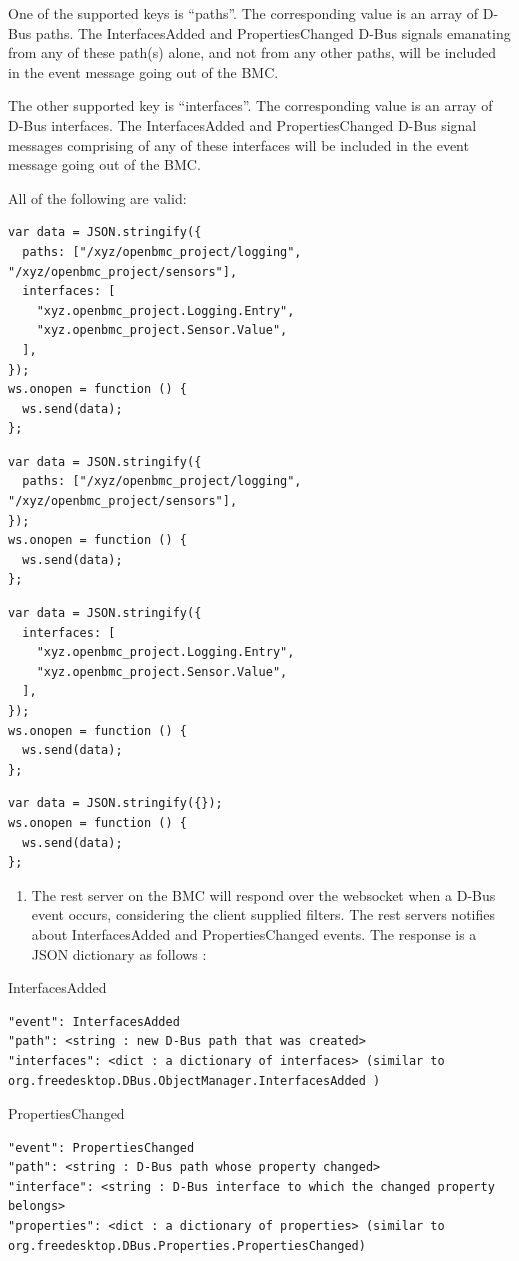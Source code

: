 One of the supported keys is ``paths''. The corresponding value is an
array of D-Bus paths. The InterfacesAdded and PropertiesChanged D-Bus
signals emanating from any of these path(s) alone, and not from any
other paths, will be included in the event message going out of the BMC.

The other supported key is ``interfaces''. The corresponding value is an
array of D-Bus interfaces. The InterfacesAdded and PropertiesChanged
D-Bus signal messages comprising of any of these interfaces will be
included in the event message going out of the BMC.

All of the following are valid:

\begin{verbatim}
var data = JSON.stringify({
  paths: ["/xyz/openbmc_project/logging", "/xyz/openbmc_project/sensors"],
  interfaces: [
    "xyz.openbmc_project.Logging.Entry",
    "xyz.openbmc_project.Sensor.Value",
  ],
});
ws.onopen = function () {
  ws.send(data);
};
\end{verbatim}

\begin{verbatim}
var data = JSON.stringify({
  paths: ["/xyz/openbmc_project/logging", "/xyz/openbmc_project/sensors"],
});
ws.onopen = function () {
  ws.send(data);
};
\end{verbatim}

\begin{verbatim}
var data = JSON.stringify({
  interfaces: [
    "xyz.openbmc_project.Logging.Entry",
    "xyz.openbmc_project.Sensor.Value",
  ],
});
ws.onopen = function () {
  ws.send(data);
};
\end{verbatim}

\begin{verbatim}
var data = JSON.stringify({});
ws.onopen = function () {
  ws.send(data);
};
\end{verbatim}

\begin{enumerate}
\def\labelenumi{\alph{enumi}.}
\setcounter{enumi}{3}
\tightlist
\item
  The rest server on the BMC will respond over the websocket when a
  D-Bus event occurs, considering the client supplied filters. The rest
  servers notifies about InterfacesAdded and PropertiesChanged events.
  The response is a JSON dictionary as follows :
\end{enumerate}

InterfacesAdded

\begin{verbatim}
"event": InterfacesAdded
"path": <string : new D-Bus path that was created>
"interfaces": <dict : a dictionary of interfaces> (similar to org.freedesktop.DBus.ObjectManager.InterfacesAdded )
\end{verbatim}

PropertiesChanged

\begin{verbatim}
"event": PropertiesChanged
"path": <string : D-Bus path whose property changed>
"interface": <string : D-Bus interface to which the changed property belongs>
"properties": <dict : a dictionary of properties> (similar to org.freedesktop.DBus.Properties.PropertiesChanged)
\end{verbatim}

